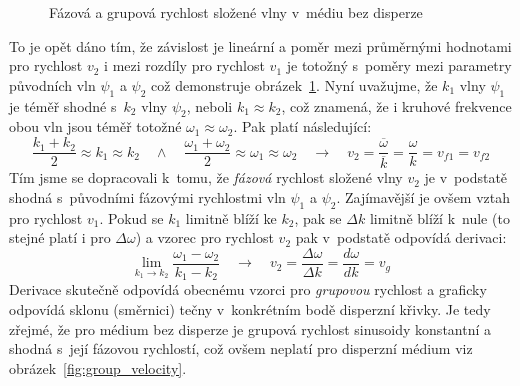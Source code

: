 \begin{figure}[htbp]
\caption{Fázová a grupová rychlost složené vlny
v~médiu bez disperze}
\label{fig:wave_sum_non_dispersive}
\end{figure}
To je opět dáno tím, že závislost je lineární
a poměr mezi průměrnými hodnotami pro rychlost
$v_2$ i mezi rozdíly pro rychlost $v_1$ je
totožný s~poměry mezi parametry původních vln
$\psi_1$ a $\psi_2$ což demonstruje
obrázek~\ref{fig:wave_sum_non_dispersive}.
Nyní uvažujme, že $k_1$ vlny $\psi_1$ je téměř
shodné s~$k_2$ vlny $\psi_2$, neboli 
$k_1 \approx k_2$, což znamená, že i
kruhové frekvence obou vln jsou téměř totožné
$\omega_1 \approx \omega_2$. Pak platí následující:
$$
\frac{k_1 + k_2}{2} \approx k_1 \approx k_2
\quad\land\quad
\frac{\omega_1 + \omega_2}{2}
\approx \omega_1 \approx \omega_2
\quad\longrightarrow\quad
v_2 =\frac{\overline{\omega}}{\overline{k}}
= \frac{\omega}{k} = v_{f1} = v_{f2}
$$
Tím jsme se dopracovali k~tomu, že
\textit{fázová} rychlost složené vlny
$v_2$ je v~podstatě shodná s~původními
fázovými rychlostmi vln $\psi_1$ a $\psi_2$.
Zajímavější je ovšem vztah pro rychlost
$v_1$. Pokud se $k_1$ limitně blíží ke
$k_2$, pak se $\Delta k$ limitně blíží
k~nule (to stejné platí i pro $\Delta\omega$)
a vzorec pro rychlost $v_2$ pak v~podstatě
odpovídá derivaci:
$$
\lim_{k_1\to k_2}\frac{\omega_1 - \omega_2}
{k_1 - k_2}
\quad\longrightarrow\quad
v_2 = \frac{\Delta\omega}{\Delta k} = 
\frac{d\omega}{dk} = v_g
$$
Derivace skutečně odpovídá obecnému vzorci
pro \textit{grupovou} rychlost a graficky
odpovídá sklonu (směrnici) tečny v~konkrétním
bodě disperzní křivky. Je tedy zřejmé, že pro
médium bez disperze je grupová rychlost sinusoidy
konstantní a shodná s~její fázovou rychlostí, což
ovšem neplatí pro disperzní médium viz
obrázek~\ref{fig:group_velocity}.
